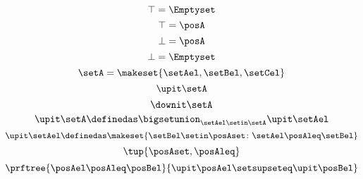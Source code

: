 {\begin{forslides}
        \begin{equation*}
            \label{eq:designlecture-topa}
            \top=\Emptyset
        \end{equation*}
        \begin{equation*}
            \label{eq:designlecture-topb}
            \top=\posA
        \end{equation*}
        \begin{equation*}
            \label{eq:designlecture-bota}
            \bot=\posA
        \end{equation*}
        \begin{equation*}
            \label{eq:designlecture-botb}
            \bot=\Emptyset
        \end{equation*}
        \begin{equation*}
            \label{eq:designlecture-upa}
            \setA=\makeset{\setAel,\setBel,\setCel}
        \end{equation*}
        \begin{equation*}
            \label{eq:designlecture-upb}
            \upit \setA
        \end{equation*}
        \begin{equation*}
            \label{eq:designlecture-upc}
            \downit \setA
        \end{equation*}
        \begin{equation*}
            \label{eq:designlecture-upd}
            \upit \setA \definedas \bigsetunion_{\setAel \setin \setA}\upit \setAel
        \end{equation*}
        \begin{equation*}
            \label{eq:designlecture-upe}
            \upit \setAel \definedas \makeset{\setBel \setin \posAset \colon \setAel \posAleq \setBel}
        \end{equation*}
        \begin{equation*}
            \label{eq:designlecture-upf}
            \tup{\posAset,\posAleq}
        \end{equation*}
        \begin{equation*}
            \label{eq:designlecture-upg}
            \prftree{\posAel\posAleq \posBel}{\upit \posAel \setsupseteq \upit \posBel}
        \end{equation*}
    \end{forslides}
}

